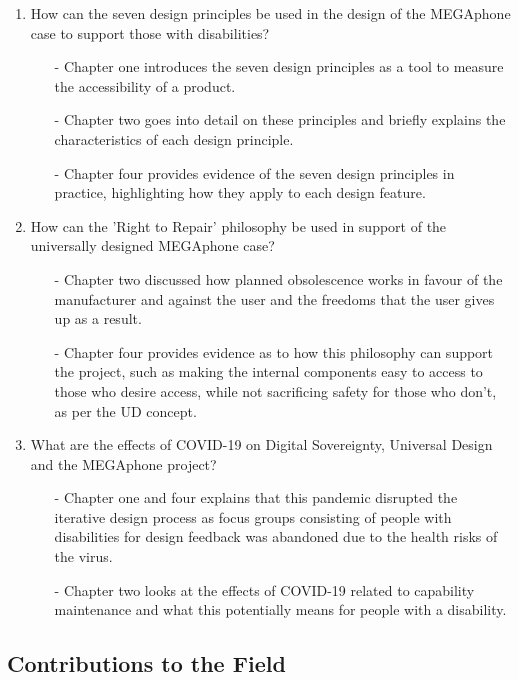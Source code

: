 \begin{enumerate}
    \item How can the seven design principles be used in the design of the MEGAphone case to support those with disabilities?
        \begin{enumerate}
        \item[-] Chapter one introduces the seven design principles as a tool to measure the accessibility of a product.
        \item[-] Chapter two goes into detail on these principles and briefly explains the characteristics of each design principle.
        \item[-] Chapter four provides evidence of the seven design principles in practice, highlighting how they apply to each design feature.
        \end{enumerate} 
    \item How can the 'Right to Repair' philosophy be used in support of the universally designed MEGAphone case?
        \begin{enumerate}
        \item[-] Chapter two discussed how planned obsolescence works in favour of the manufacturer and against the user and the freedoms that the user gives up as a result.
        \item[-] Chapter four provides evidence as to how this philosophy can support the project, such as making the internal components easy to access to those who desire access, while not sacrificing safety for those who don't, as per the UD concept.
        \end{enumerate} 
    \item What are the effects of COVID-19 on Digital Sovereignty, Universal Design and the MEGAphone project?
        \begin{enumerate}
        \item[-] Chapter one and four explains that this pandemic disrupted the iterative design process as focus groups consisting of people with disabilities for design feedback was abandoned due to the health risks of the virus.
        \item[-] Chapter two looks at the effects of COVID-19 related to capability maintenance and what this potentially means for people with a disability.
        \end{enumerate} 
\end{enumerate}

\subsection{Contributions to the Field}

